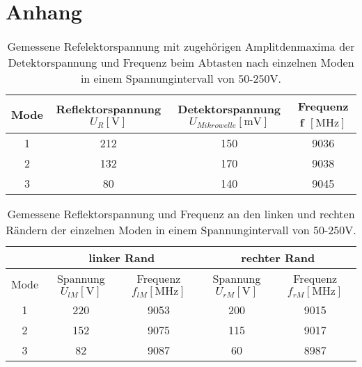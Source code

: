 \section{Anhang}

\begin{table}
    \centering
    \caption{Gemessene Refelektorspannung mit zugehörigen Amplitdenmaxima der Detektorspannung und Frequenz beim Abtasten nach einzelnen Moden in einem Spannungintervall von $50$-$250 \si{\volt}$.} 
    \label{tab:Messreihe11}
    \begin{tabular}{c | c c c}
        \toprule
        Mode & Reflektorspannung $U_{R} [\si{\volt}] $ & Detektorspannung $ U_{Mikrowelle} [\si{\milli\volt}] $ & Frequenz f $[\si{\mega\hertz}]$ \\
        \midrule
        1      &      212         &       150              &        9036 \\
        2      &      132         &       170              &        9038 \\
        3      &      80          &       140              &        9045 \\
    \end{tabular}
\end{table}
 
\begin{table}
    \centering
    \caption{Gemessene Reflektorspannung und Frequenz an den linken und rechten Rändern der einzelnen Moden in einem Spannungintervall von $50$-$250 \si{\volt}$.}
    \label{tab:Messreihe12}
    \begin{tabular}{c | c c | c c}
        \midrule
        ~ &  \multicolumn{2}{c}{linker Rand} & \multicolumn{2}{c}{rechter Rand} \\
        \toprule
        Mode & Spannung $U_{lM} [\si{\volt}] $ & Frequenz $f_{lM}[\si{\mega\hertz}]$ & Spannung $U_{rM} [\si{\volt}] $ & Frequenz $f_{rM}[\si{\mega\hertz}]$ \\
        \midrule
        1     &     220         &            9053            &                200          &              9015      \\
        2      &    152         &            9075            &                115          &              9017      \\
        3       &   82          &            9087            &                60           &              8987      \\
    \end{tabular}
\end{table}

